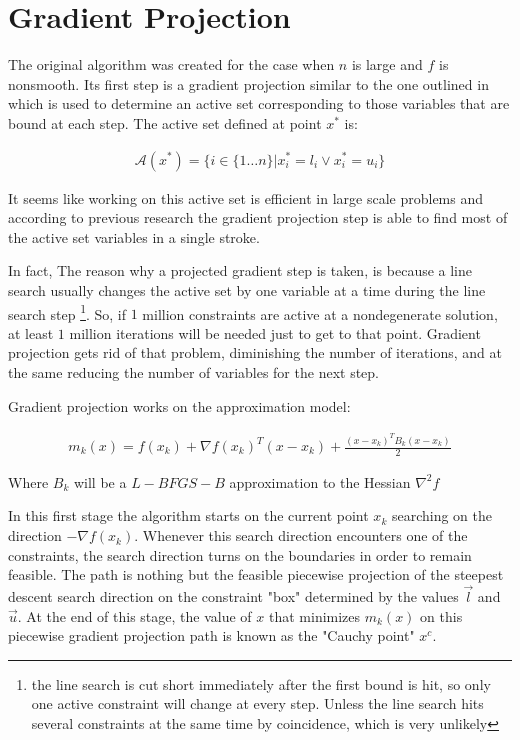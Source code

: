 \section{Gradient Projection}
The original algorithm was created for the case when $n$ is large and $f$ is nonsmooth. Its first step is a gradient projection similar to the one outlined in \citep{gradproj1, gradproj2} which is used to determine an active set corresponding to those variables that are bound at each step. The active set defined at point $x^*$ is:

\begin{equation}
  \begin{aligned}
    \mathcal{A}(x^*) = \{ i \in \{1 \ldots n\} |  x^*_i = l_i \vee  x^*_i = u_i\}
  \end{aligned}
\end{equation}

It seems like working on this active set is efficient in large scale problems and according to previous research \citep{nocedal} the gradient projection step is able to find most of the active set variables in a single stroke. 

In fact, The reason why a projected gradient step is taken, is because a line search usually changes the active set by one variable at a time during the line search step \footnote{the line search is cut short immediately after the first bound is hit, so only one active constraint will change at every step. Unless the line search hits several constraints at the same time by coincidence, which is very unlikely}. So, if $1$ million constraints are active at a nondegenerate solution, at least $1$ million iterations will be needed just to get to that point.  Gradient projection gets rid of that problem, diminishing the number of iterations, and at the same reducing the number of variables for the next step.

Gradient projection works on the approximation model:

\begin{equation} \label{themodel}
  \begin{aligned}
    m_k(x) = f(x_k) + \nabla f(x_k)^T ( x - x_k) + \frac{(x - x_k)^T B_k (x - x_k) }{2}
  \end{aligned}
\end{equation}

Where $B_k$ will be a $L-BFGS-B$ approximation to the Hessian $\nabla^2 f$

In this first stage the algorithm starts on the current point $x_k$ searching on the direction $-\nabla f(x_k)$. Whenever this search direction encounters one of the constraints, the search direction turns on the boundaries in order to remain feasible. The path is nothing but the feasible piecewise projection of the steepest descent search direction on the constraint "box" determined by the values $\overrightarrow{l}$ and $\overrightarrow{u}$. At the end of this stage, the value of $x$ that minimizes $m_k(x)$ on this piecewise gradient projection path is known as the "Cauchy point" $x^c$.

